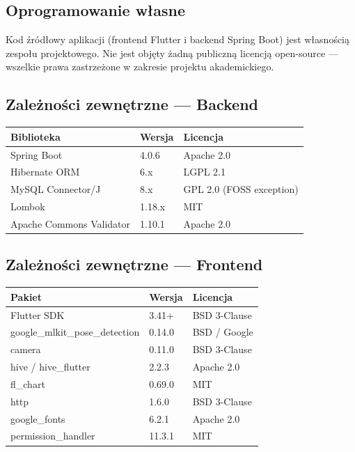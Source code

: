 \documentclass[12pt,a4paper]{article}
\begin{document}
\subsection{Oprogramowanie własne}

Kod źródłowy aplikacji (frontend Flutter i backend Spring Boot) jest własnością zespołu projektowego. Nie jest objęty żadną publiczną licencją open-source --- wszelkie prawa zastrzeżone w zakresie projektu akademickiego.

\subsection{Zależności zewnętrzne --- Backend}

\begin{center}
\begin{tabular}{lll}
  \toprule
  \textbf{Biblioteka} & \textbf{Wersja} & \textbf{Licencja} \\
  \midrule
  Spring Boot               & 4.0.6  & Apache 2.0 \\
  Hibernate ORM             & 6.x    & LGPL 2.1 \\
  MySQL Connector/J         & 8.x    & GPL 2.0 (FOSS exception) \\
  Lombok                    & 1.18.x & MIT \\
  Apache Commons Validator  & 1.10.1 & Apache 2.0 \\
  \bottomrule
\end{tabular}
\end{center}

\subsection{Zależności zewnętrzne --- Frontend}

\begin{center}
\begin{tabular}{lll}
  \toprule
  \textbf{Pakiet} & \textbf{Wersja} & \textbf{Licencja} \\
  \midrule
  Flutter SDK                    & 3.41+  & BSD 3-Clause \\
  google\_mlkit\_pose\_detection & 0.14.0 & BSD / Google \\
  camera                         & 0.11.0 & BSD 3-Clause \\
  hive / hive\_flutter           & 2.2.3  & Apache 2.0 \\
  fl\_chart                      & 0.69.0 & MIT \\
  http                           & 1.6.0  & BSD 3-Clause \\
  google\_fonts                  & 6.2.1  & Apache 2.0 \\
  permission\_handler            & 11.3.1 & MIT \\
  \bottomrule
\end{tabular}
\end{center}
\end{document}
